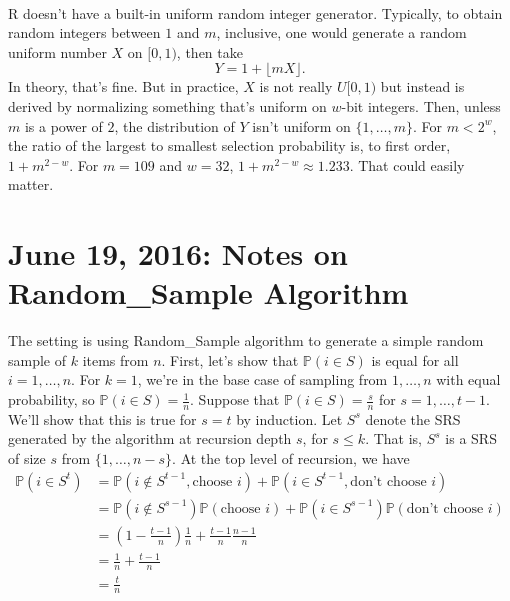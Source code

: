 \documentclass[12pt]{article}
\newcommand{\todo}[1]{{\color{red}{TO DO: \sc #1}}}
\newcommand{\pr}{\mathbb{P}} %
\begin{document}
\todo{It seems like this algorithm would give a higher probability of generating the upper bound.
Are all integers actually equally likely?}\\

R doesn't have a built-in uniform random integer generator. 
Typically, to obtain random integers between $1$ and $m$, inclusive, one would generate a random uniform number $X$ on $[0, 1)$, then take
$$Y = 1 + \lfloor m X \rfloor.$$
In theory, that's fine. 
But in practice, $X$ is not really $U[0,1)$ but instead is derived by normalizing something that's uniform on $w$-bit integers. 
Then, unless $m$ is a power of $2$, the distribution of $Y$ isn't uniform on $\{1,\dots,m\}$. 
For $m<2^w$, the ratio of the largest to smallest selection probability is, to first order, $1+m^{2-w}$.
For $m=109$ and $w=32$, $1+m^{2-w}\approx1.233$. 
That could easily matter.




\section{June 19, 2016: Notes on Random\_Sample Algorithm}
The setting is using Random\_Sample algorithm to generate a simple random sample of $k$ items from $n$.
First, let's show that $\pr(i \in S)$ is equal for all $i = 1, \dots, n$.
For $k=1$, we're in the base case of sampling from $1, \dots, n$ with equal probability, so $\pr(i \in S) = \frac{1}{n}$.
Suppose that $\pr(i \in S) = \frac{s}{n}$ for $s = 1, \dots, t-1$.
We'll show that this is true for $s = t$ by induction.
Let $S^s$ denote the SRS generated by the algorithm at recursion depth $s$, for $s \leq k$.
That is, $S^s$ is a SRS of size $s$ from $\{1, \dots, n - s\}$.
At the top level of recursion, we have
\begin{align*}
\pr(i \in S^t) &= \pr(i \notin S^{t-1}, \text{choose } i) + \pr(i \in S^{t-1}, \text{don't choose } i) \\
&=  \pr(i \notin S^{s-1})\pr(\text{choose } i) + \pr(i \in S^{s-1})\pr(\text{don't choose } i) \tag*{by independent sampling}\\
&= \left(1-\frac{t-1}{n}\right)\frac{1}{n} + \frac{t-1}{n}\frac{n-1}{n} \\
&= \frac{1}{n} + \frac{t-1}{n} \\
&= \frac{t}{n}
\end{align*}
\end{document}
